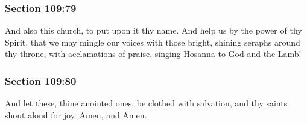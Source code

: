 	\subsubsection{Section 109:79} %
		\label{DC109-79}

		And also this church, to put upon it thy name.  And help us by the power of thy Spirit, that we may mingle our voices with those bright, shining seraphs around thy throne, with acclamations of praise, singing Hosanna to God and the Lamb!


	\subsubsection{Section 109:80} %
		\label{DC109-80}

		And let these, thine anointed ones, be clothed with salvation, and thy saints shout aloud for joy.  Amen, and Amen.

